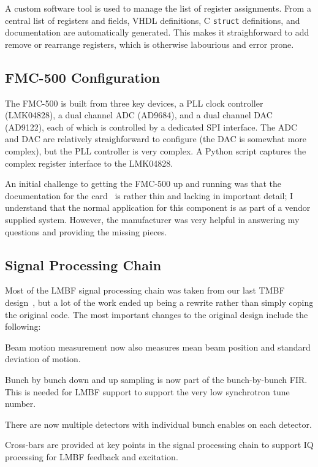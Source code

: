 \documentclass[
    a4paper,
    keeplastbox,            %
    hyphens,                %
    nospread,               %
]{jacow}
\begin{document}
A custom software tool is used to manage the list of register assignments.  From
a central list of registers and fields, VHDL definitions, C \texttt{struct}
definitions, and documentation are automatically generated.  This makes it
straighforward to add remove or rearrange registers, which is otherwise
labourious and error prone.


\subsection{FMC-500 Configuration}

The FMC-500 is built from three key devices, a PLL clock controller (LMK04828),
a dual channel ADC (AD9684), and a dual channel DAC (AD9122), each of which is
controlled by a dedicated SPI interface.  The ADC and DAC are relatively
straighforward to configure (the DAC is somewhat more complex), but the PLL
controller is very complex.  A Python script captures the complex register
interface to the LMK04828.


An initial challenge to getting the FMC-500 up and running was that the
documentation for the card~\cite{fmc500} is rather thin and lacking in important
detail; I understand that the normal application for this component is as part
of a vendor supplied system.  However, the manufacturer was very helpful in
answering my questions and providing the missing pieces.


\subsection{Signal Processing Chain}

Most of the LMBF signal processing chain was taken from our last TMBF
design~\cite{icalepcs2015}, but a lot of the work ended up being a rewrite
rather than simply coping the original code.  The most important changes to the
original design include the following:
\begin{Itemize}
\item
    Beam motion measurement now also measures mean beam position and standard
    deviation of motion.
\item
    Bunch by bunch down and up sampling is now part of the bunch-by-bunch FIR.
    This is needed for LMBF support to support the very low synchrotron tune
    number.
\item
    There are now multiple detectors with individual bunch enables on each
    detector.
\item
    Cross-bars are provided at key points in the signal processing chain to
    support IQ processing for LMBF feedback and excitation.
\end{Itemize}
\end{document}
